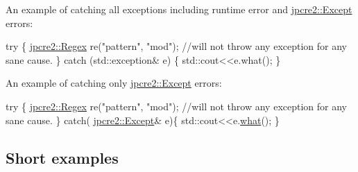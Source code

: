 An example of catching all exceptions including runtime error and \hyperlink{classjpcre2_1_1Except}{jpcre2\+::\+Except} errors\+:


\begin{DoxyCode}
\textcolor{keywordflow}{try} \{
    \hyperlink{classjpcre2_1_1Regex}{jpcre2::Regex} re(\textcolor{stringliteral}{"pattern"}, \textcolor{stringliteral}{"mod"}); \textcolor{comment}{//will not throw any exception for any sane cause.}
\} \textcolor{keywordflow}{catch} (std::exception& e) \{
    std::cout<<e.what();
\}
\end{DoxyCode}


An example of catching only \hyperlink{classjpcre2_1_1Except}{jpcre2\+::\+Except} errors\+:


\begin{DoxyCode}
\textcolor{keywordflow}{try} \{
    \hyperlink{classjpcre2_1_1Regex}{jpcre2::Regex} re(\textcolor{stringliteral}{"pattern"}, \textcolor{stringliteral}{"mod"}); \textcolor{comment}{//will not throw any exception for any sane cause.}
\}
\textcolor{keywordflow}{catch}( \hyperlink{classjpcre2_1_1Except}{jpcre2::Except}& e)\{
    std::cout<<e.\hyperlink{classjpcre2_1_1Except_aa16bdec8432ee950955f7ad81a9655bb_aa16bdec8432ee950955f7ad81a9655bb}{what}();
\}
\end{DoxyCode}
\hypertarget{index_short-examples}{}\subsection{Short examples}\label{index_short-examples}

